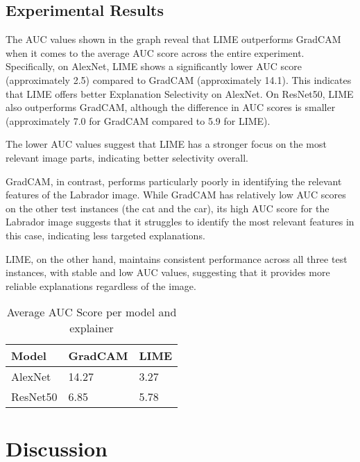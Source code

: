 \documentclass{article}
\begin{document}

\subsection{Experimental Results}
The AUC values shown in the graph reveal that LIME outperforms GradCAM when it comes to the average AUC score across the entire experiment. Specifically, on AlexNet, LIME shows a significantly lower AUC score (approximately 2.5) compared to GradCAM (approximately 14.1). This indicates that LIME offers better Explanation Selectivity on AlexNet. On ResNet50, LIME also outperforms GradCAM, although the difference in AUC scores is smaller (approximately 7.0 for GradCAM compared to 5.9 for LIME).


The lower AUC values suggest that LIME has a stronger focus on the most relevant image parts, indicating better selectivity overall.

GradCAM, in contrast, performs particularly poorly in identifying the relevant features of the Labrador image. While GradCAM has relatively low AUC scores on the other test instances (the cat and the car), its high AUC score for the Labrador image suggests that it struggles to identify the most relevant features in this case, indicating less targeted explanations.

LIME, on the other hand, maintains consistent performance across all three test instances, with stable and low AUC values, suggesting that it provides more reliable explanations regardless of the image.

\begin{table}
    \centering
    \begin{tabular}{lll}
        \hline
        Model  & GradCAM & LIME \\
        \hline
        AlexNet     & 14.27     & 3.27 \\
        ResNet50      & 6.85     & 5.78  \\
        \hline
    \end{tabular}
    \caption{Average AUC Score per model and explainer}
    \label{tab:plain}
\end{table}

\section{Discussion}
\end{document}
